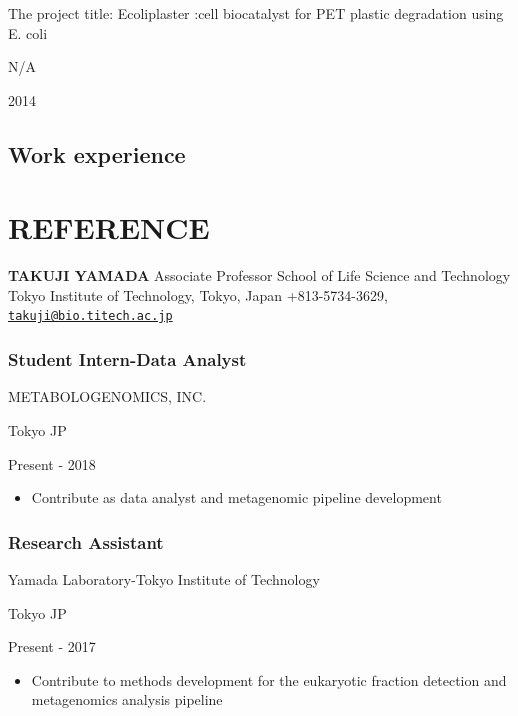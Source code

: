 \documentclass[]{article}
\providecommand{\tightlist}{%
  \setlength{\itemsep}{0pt}\setlength{\parskip}{0pt}}
\begin{document}
The project title: Ecoliplaster :cell biocatalyst for PET plastic
degradation using E. coli

N/A

2014

\hypertarget{work-experience}{%
\subsection{Work experience}\label{work-experience}}

\hypertarget{reference}{%
\section{REFERENCE}\label{reference}}

\textbf{TAKUJI YAMADA} Associate Professor School of Life Science and
Technology Tokyo Institute of Technology, Tokyo, Japan +813-5734-3629,
\href{mailto:takuji@bio.titech.ac.jp}{\nolinkurl{takuji@bio.titech.ac.jp}}

\hypertarget{student-intern-data-analyst}{%
\subsubsection{\texorpdfstring{\textbf{Student Intern-Data
Analyst}}{Student Intern-Data Analyst}}\label{student-intern-data-analyst}}

METABOLOGENOMICS, INC.

Tokyo JP

Present - 2018

\begin{itemize}
\tightlist
\item
  Contribute as data analyst and metagenomic pipeline development
\end{itemize}

\hypertarget{research-assistant}{%
\subsubsection{\texorpdfstring{\textbf{Research
Assistant}}{Research Assistant}}\label{research-assistant}}

Yamada Laboratory-Tokyo Institute of Technology

Tokyo JP

Present - 2017

\begin{itemize}
\tightlist
\item
  Contribute to methods development for the eukaryotic fraction
  detection and metagenomics analysis pipeline
\end{itemize}
\end{document}
